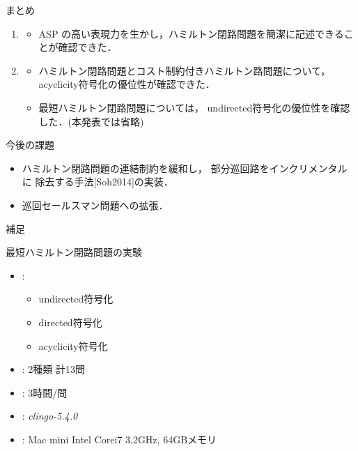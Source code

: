 \documentclass[dvipdfmx,10pt]{beamer}
\begin{document}
\begin{frame}{まとめ}
    \begin{enumerate}
    \item {}
      \begin{itemize}
      \item ASP の高い表現力を生かし，ハミルトン閉路問題を簡潔に記述できることが確認できた．
      \end{itemize}
    \item {}
      \begin{itemize}
      \item ハミルトン閉路問題とコスト制約付きハミルトン路問題について，
        \textsf{acyclicity}符号化の優位性が確認できた．
      \item 最短ハミルトン閉路問題については，
        \textsf{undirected}符号化の優位性を確認した．(本発表では省略)
      \end{itemize}
    \end{enumerate}
  \begin{alertblock}{今後の課題}
    \begin{itemize}
    \item ハミルトン閉路問題の連結制約を緩和し，
      部分巡回路をインクリメンタルに
      除去する手法[Soh2014]の実装．
    \item 巡回セールスマン問題への拡張．
    \end{itemize}
  \end{alertblock}
\end{frame}

\begin{frame}[noframenumbering]{}
  補足
\end{frame}

\begin{frame}[noframenumbering]{最短ハミルトン閉路問題の実験}
  \begin{itemize}
  \item {}:
    \begin{itemize}
    \item \textsf{undirected}符号化
    \item \textsf{directed}符号化
    \item \textsf{acyclicity}符号化
    \end{itemize}
  \item {}: 2種類 計13問
  \item {}: 3時間/問
  \item {}: \textit{clingo-5.4.0}
  \item {}: Mac mini Intel Corei7 3.2GHz, 64GBメモリ
  \end{itemize}
\end{frame}
\end{document}
